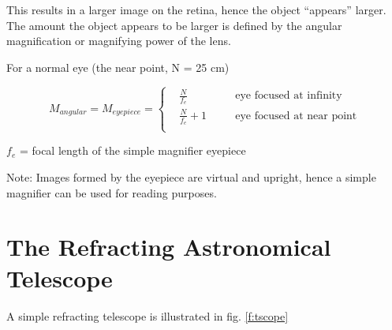 This results in a larger image on the retina, hence the object ``appears'' larger. The amount the object appears to be larger is defined by the angular magnification or magnifying power of the lens.

For a normal eye (the near point, N = 25 cm)



\begin{equation}\label{e:mag}
	M_{angular} = M_{eyepiece} =
	\left\{
	\begin{alignedat}{2}
		&\frac{N}{f_e}		&& \quad\text {eye focused at infinity}\\
		&\frac{N}{f_e} + 1 	&& \quad\text {eye focused at near point}\\
	 \end{alignedat}
	\right.
\end{equation}


$f_e$ = focal length of the simple magnifier eyepiece

Note: Images formed by the eyepiece are virtual and upright, hence a simple magnifier can be used for reading purposes.

\section{The Refracting Astronomical Telescope}
A simple refracting telescope is illustrated in fig. \ref{f:tscope}

